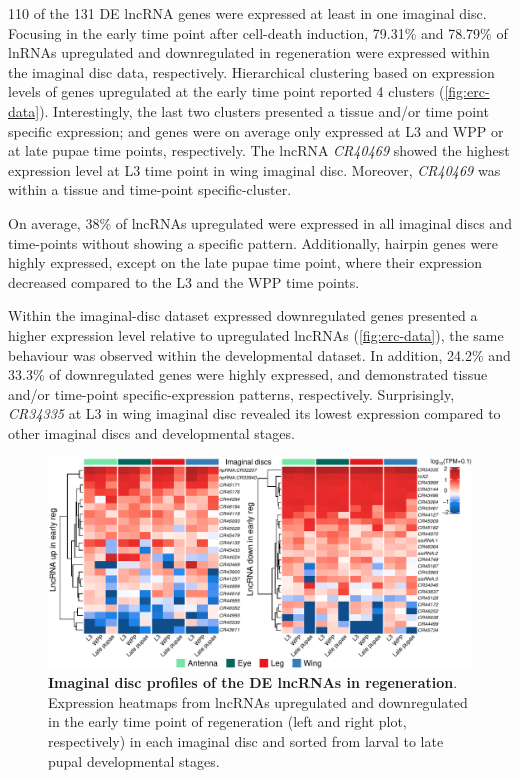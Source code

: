 110 of the 131 DE lncRNA genes were expressed at least in one imaginal disc. Focusing in the early time point after cell-death induction, 79.31\% and 78.79\% of lnRNAs upregulated and downregulated in regeneration were expressed within the imaginal disc data, respectively. Hierarchical clustering based on expression levels of genes upregulated at the early time point reported 4 clusters (\autoref{fig:erc-data}). Interestingly, the last two clusters presented a tissue and/or time point specific expression; and genes were on average only expressed at L3 and WPP or at late pupae time points, respectively. The lncRNA \textit{CR40469} showed the highest expression level at L3 time point in wing imaginal disc. Moreover, \textit{CR40469} was within a tissue and time-point specific-cluster.

On average, 38\% of lncRNAs upregulated were expressed in all imaginal discs and time-points without showing a specific pattern. Additionally, hairpin genes were highly expressed, except on the late pupae time point, where their expression decreased compared to the L3 and the WPP time points.

Within the imaginal-disc dataset expressed downregulated genes presented a higher expression level relative to upregulated lncRNAs (\autoref{fig:erc-data}), the same behaviour was observed within the developmental dataset. In addition, 24.2\% and 33.3\% of downregulated genes were highly expressed, and demonstrated tissue and/or time-point specific-expression patterns, respectively. Surprisingly, \textit{CR34335} at L3 in wing imaginal disc revealed its lowest expression compared to other imaginal discs and developmental stages.  

\begin{figure}[ht!]
  \centering
  \includegraphics[scale=0.6]{plots/results/dme/two.heatmaps.erc.pdf}
  \caption[Imaginal disc profiles of the DE lncRNAs in regeneration]{\textbf{Imaginal disc profiles of the DE lncRNAs in regeneration}. Expression heatmaps from lncRNAs upregulated and downregulated in the early time point of regeneration (left and right plot, respectively) in each imaginal disc and sorted from larval to late pupal developmental stages.}
  \label{fig:erc-data}
\end{figure}

